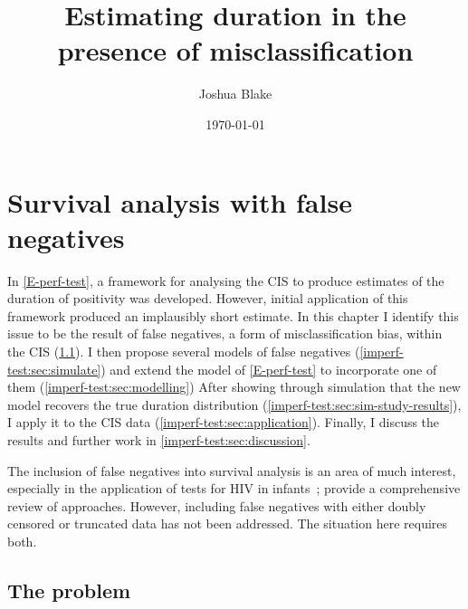 \documentclass[thesis.tex]{subfiles}
\title{Estimating duration in the presence of misclassification}
\author{Joshua Blake}
\date{\today}
\begin{document}
\ifSubfilesClassLoaded{
  \setcounter{chapter}{5}
}

\chapter{Survival analysis with false negatives} \label{imperf-test}

In \cref{E-perf-test}, a framework for analysing the CIS to produce estimates of the duration of positivity was developed.
However, initial application of this framework produced an implausibly short estimate.
In this chapter I identify this issue to be the result of false negatives, a form of misclassification bias, within the CIS (\cref{imperf-test:sec:problem}).
I then propose several models of false negatives (\cref{imperf-test:sec:simulate}) and extend the model of \cref{E-perf-test} to incorporate one of them (\cref{imperf-test:sec:modelling})
After showing through simulation that the new model recovers the true duration distribution (\cref{imperf-test:sec:sim-study-results}), I apply it to the CIS data (\cref{imperf-test:sec:application}).
Finally, I discuss the results and further work in \cref{imperf-test:sec:discussion}.

The inclusion of false negatives into survival analysis is an area of much interest, especially in the application of tests for HIV in infants~\autocite[e.g.][]{brownBayesian,balasubramanianEstimation};
\textcite{piresIntervalMisclassify} provide a comprehensive review of approaches.
However, including false negatives with either doubly censored or truncated data has not been addressed.
The situation here requires both.



\section{The problem} \label{imperf-test:sec:problem}
\end{document}
